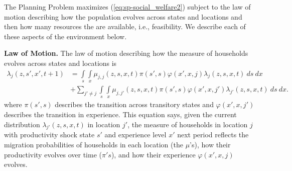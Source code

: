 \documentclass[12pt,pdftex]{article}
\begin{document}
\begin{onehalfspacing}
The Planning Problem maximizes (\ref{eq:sp-social_welfare2}) subject to the law of motion describing how the population evolves across states and locations and then how many resources the are available, i.e., feasibility. We describe each of these aspects of the environment below.

\textbf{Law of Motion.} The law of motion describing how the measure of households evolves across states and locations is
\begin{align}
\lambda_{j}(z, s', x', t+1)  & =  \int\limits_{s} \int\limits_{x}  \mu_{j,j}(z, s,x,t)\pi(s',s) \varphi(x',x, j) \lambda_{j}(z, s, x, t)  \ ds \ dx  \  \label{eq:planner_law_motion} \\
& +  \sum_{j' \neq j} \int\limits_{s} \int\limits_{x} \mu_{j,j'}(z, s,x,t) \pi(s',s) \varphi(x',x, j') \lambda_{j'}(z, s, x, t)  \ ds  \ dx. \nonumber
\end{align}
where $\pi(s',s)$ describes the transition across transitory states and $\varphi(x',x, j')$ describes the transition in experience. This equation says, given the current distribution  $\lambda_{j'}(z, s, x, t)$ in location $j'$, the measure of households in location $j$ with productivity shock state $s'$ and experience level $x'$ next period reflects the migration probabilities of households in each location (the $\mu$'s), how their productivity evolves over time ($\pi's$), and how their experience $\varphi(x',x, j)$ evolves. 


\end{onehalfspacing}
\end{document}
